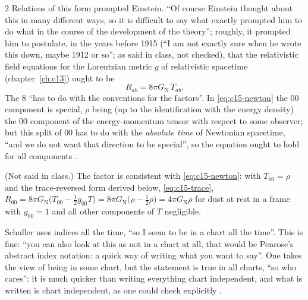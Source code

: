 \begin{paracol}{2}
Relations of this form prompted Einstein. ``Of course Einstein thought about this in many different ways, so it is difficult to say what exactly prompted him to do what in the course of the development of the theory''; roughly, it prompted him to postulate, in the years before 1915 (``I am not exactly sure when he wrote this down, maybe 1912 or so''; as said in class, not checked), that the relativistic field equations for the Lorentzian metric $g$ of relativistic spacetime (chapter~\ref{ch:c13}) ought to be
\begin{equation}\label{eq:c15-guess}
  R_{ab}=8\pi G_{\mathrm N}\,T_{ab}.
\end{equation}
The $8$ ``has to do with the conventions for the factors''. In \eqref{eq:c15-newton} the $00$ component is special, $\rho$ being (up to the identification with the energy density) the $00$ component of the energy-momentum tensor with respect to some observer; but this split of $00$ has to do with the \emph{absolute time} of Newtonian spacetime, ``and we do not want that direction to be special'', so the equation ought to hold for all components .
\begin{coursenote}
(Not said in class.) The factor is consistent with \eqref{eq:c15-newton}: with $T_{00}=\rho$ and the trace-reversed form derived below, \eqref{eq:c15-trace}, $R_{00}=8\pi G_{\mathrm N}\bigl(T_{00}-\tfrac12g_{00}T\bigr)=8\pi G_{\mathrm N}\bigl(\rho-\tfrac12\rho\bigr)=4\pi G_{\mathrm N}\rho$ for dust at rest in a frame with $g_{00}=1$ and all other components of $T$ negligible.
\end{coursenote}
\begin{coursenote}
Schuller uses indices all the time, ``so I seem to be in a chart all the time''. This is fine: ``you can also look at this as not in a chart at all, that would be Penrose's abstract index notation: a quick way of writing what you want to say''. One takes the view of being in some chart, but the statement is true in all charts, ``so who cares'': it is much quicker than writing everything chart independent, and what is written is chart independent, as one could check explicitly .
\end{coursenote}


\end{paracol}
